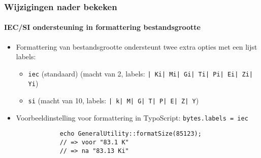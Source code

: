 
\begin{frame}[fragile]
	\frametitle{Wijzigingen nader bekeken}
	\framesubtitle{IEC/SI ondersteuning in formattering bestandsgrootte}


	\begin{itemize}

		\item Formattering van bestandsgrootte ondersteunt twee extra opties met een lijst labels:

			\begin{itemize}
				\item \small\texttt{iec} (standaard)\newline
					\small(macht van 2, labels: \texttt{| Ki| Mi| Gi| Ti| Pi| Ei| Zi| Yi})\normalsize
				\item \small\texttt{si}\newline
					\small(macht van 10, labels: \texttt{| k| M| G| T| P| E| Z| Y})\normalsize
			\end{itemize}

		\item Voorbeeldinstelling voor formattering in TypoScript:\newline
			\texttt{bytes.labels = iec}

		\begin{lstlisting}
			echo GeneralUtility::formatSize(85123);
			// => voor "83.1 K"
			// => na "83.13 Ki"
		\end{lstlisting}

	\end{itemize}

\end{frame}


